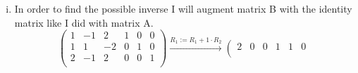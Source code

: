 \documentclass[a4paper]{article}
\begin{document}
\begin{enumerate}[i)]
\[\begin{array}{ccc|ccc}
0 & 0 & 6  & 0 & - 1 & 1 \\
\end{array}
\right)
\xrightarrow{\text{$R_3 := \frac{1}{6} R_3$}}
\left(
\begin{array}{ccc|ccc}
2 & 0 & 0 & 1 & 1 & 0 \\
0 & 1 & -2 & - \frac{1}{2} & \frac{1}{2} & 0 \\
0 & 0 & 1  & 0 & - \frac{1}{6} & \frac{1}{6} \\
\end{array}
\right)
\]
Now we see that the system has n pivots, we may continue to the Echelon form to find the inverse.
\[
\xrightarrow{\text{$R_2 := R_2 + 2 \cdot R_3$}}
\left(
\begin{array}{ccc|ccc}
2 & 0 & 0 & 1 & 1 & 0 \\
0 & 1 & 0 & - \frac{1}{2} & \frac{1}{6} & \frac{1}{3} \\
0 & 0 & 1  & 0 & - \frac{1}{6} & \frac{1}{6} \\
\end{array}
\right)
\xrightarrow{\text{$R_1 := \frac{1}{2} R_1$}}
\left(
\begin{array}{ccc|ccc}
1 & 0 & 0 & \frac{1}{2} & \frac{1}{2} & 0 \\
0 & 1 & 0 & - \frac{1}{2} & \frac{1}{6} & \frac{1}{3} \\
0 & 0 & 1  & 0 & - \frac{1}{6} & \frac{1}{6} \\
\end{array}
\right)
\]
Now we see that the inverse of the matrix A is as follows:
\[
A^{-1} =
\left(
\begin{array}{ccc}
\frac{1}{2} & \frac{1}{2} & 0 \\
- \frac{1}{2} & \frac{1}{6} & \frac{1}{3} \\
0 & - \frac{1}{6} & \frac{1}{6} \\
\end{array}
\right)
\]
  \item In order to find the possible inverse I will augment matrix B with the identity matrix like I did with matrix A.
  \[
  \left(
  \begin{array}{ccc|ccc}
  1 & -1 & 2 & 1 & 0 & 0 \\
  1 & 1 & -2 & 0 & 1 & 0 \\
  2 & -1 & 2  & 0 & 0 & 1 \\
  \end{array}
  \right)
  \xrightarrow{\text{$R_1 := R_1 +  1 \cdot R_2$}}
  \left(
  \begin{array}{ccc|ccc}
  2 & 0 & 0 & 1 & 1 & 0 \\

\end{array}\]
\end{enumerate}
\end{document}
